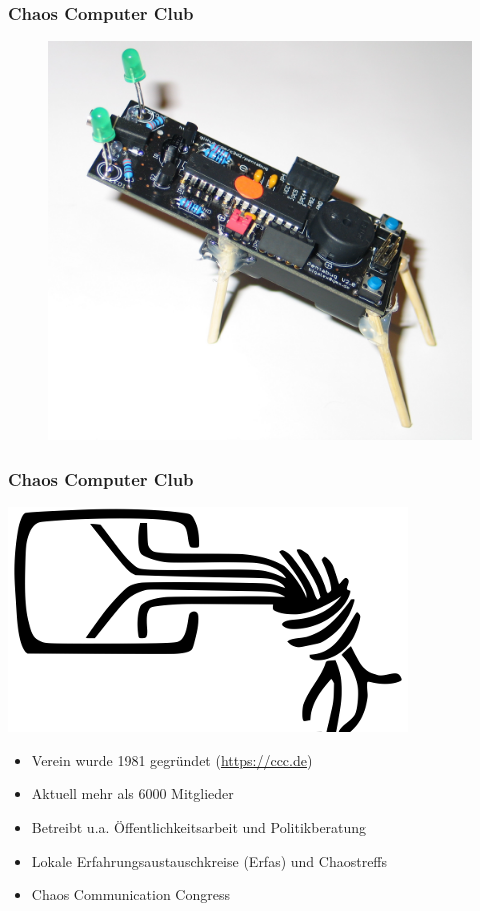 \documentclass[12pt]{beamer}
\begin{document}
\begin{frame}
  \frametitle{Chaos Computer Club}
  \begin{figure}
    \includegraphics[height=0.7\textheight]{img/pentabug.jpg}
  \end{figure}
\end{frame}

\begin{frame}
    \frametitle{Chaos Computer Club}
    \begin{center}
  \includegraphics[height=0.2\textheight]{img/chaosknoten.png}
    \end{center}
    \begin{itemize}
      \item<1-> Verein wurde 1981 gegründet (\url{https://ccc.de})
      \item<2-> Aktuell mehr als 6000 Mitglieder
      \item<3-> Betreibt u.a. Öffentlichkeitsarbeit und Politikberatung
      \item<4-> Lokale Erfahrungsaustauschkreise (Erfas) und Chaostreffs
      \item<5-> Chaos Communication Congress
    \end{itemize}
\end{frame}
\end{document}
